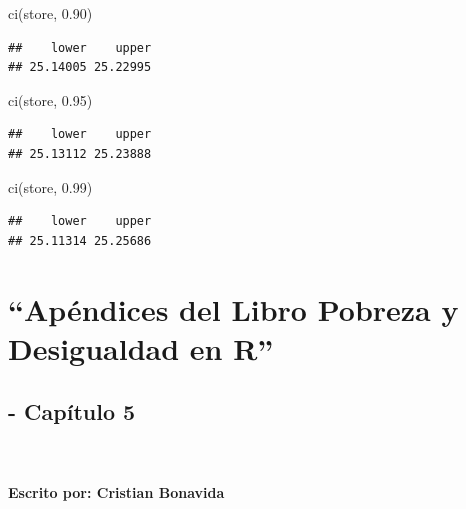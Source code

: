 \documentclass[
]{book}
\newenvironment{Shaded}{\begin{snugshade}}{\end{snugshade}}
\newcommand{\FloatTok}[1]{\textcolor[rgb]{0.00,0.00,0.81}{#1}}
\newcommand{\FunctionTok}[1]{\textcolor[rgb]{0.00,0.00,0.00}{#1}}
\newcommand{\NormalTok}[1]{#1}
\begin{document}
\begin{Shaded}
\begin{Highlighting}[]
\FunctionTok{ci}\NormalTok{(store, }\FloatTok{0.90}\NormalTok{)}
\end{Highlighting}
\end{Shaded}

\begin{verbatim}
##    lower    upper 
## 25.14005 25.22995
\end{verbatim}

\begin{Shaded}
\begin{Highlighting}[]
\FunctionTok{ci}\NormalTok{(store, }\FloatTok{0.95}\NormalTok{)}
\end{Highlighting}
\end{Shaded}

\begin{verbatim}
##    lower    upper 
## 25.13112 25.23888
\end{verbatim}

\begin{Shaded}
\begin{Highlighting}[]
\FunctionTok{ci}\NormalTok{(store, }\FloatTok{0.99}\NormalTok{)}
\end{Highlighting}
\end{Shaded}

\begin{verbatim}
##    lower    upper 
## 25.11314 25.25686
\end{verbatim}

\hypertarget{apuxe9ndices-del-libro-pobreza-y-desigualdad-en-r-2}{%
\chapter{``Apéndices del Libro Pobreza y Desigualdad en R''}\label{apuxe9ndices-del-libro-pobreza-y-desigualdad-en-r-2}}

\hypertarget{capuxedtulo-5}{%
\section{- Capítulo 5}\label{capuxedtulo-5}}

~

\hypertarget{escrito-por-cristian-bonavida-2}{%
\subsubsection*{Escrito por: Cristian Bonavida}\label{escrito-por-cristian-bonavida-2}}
\end{document}
